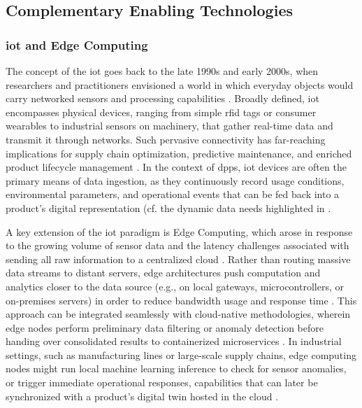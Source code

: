 \subsection{Complementary Enabling Technologies}

\subsubsection*{\acrlong{iot} and Edge Computing}
The concept of the \acrlong{iot} goes back to the late 1990s and early 2000s, when researchers and practitioners envisioned a world in which everyday objects would carry networked sensors and processing capabilities \autocite{Ashton.2009, Gubbi.2013}. Broadly defined, \ac{iot} encompasses physical devices, ranging from simple \ac{rfid} tags or consumer wearables to industrial sensors on machinery, that gather real-time data and transmit it through networks. Such pervasive connectivity has far-reaching implications for supply chain optimization, predictive maintenance, and enriched product lifecycle management \autocite{Gubbi.2013}. In the context of \ac{dpp}s, \ac{iot} devices are often the primary means of data ingestion, as they continuously record usage conditions, environmental parameters, and operational events that can be fed back into a product’s digital representation (cf. the dynamic data needs highlighted in \textcite{DeutschesInstitutfurNormunge.V..2020, Kuhn.2025}.

A key extension of the \ac{iot} paradigm is Edge Computing, which arose in response to the growing volume of sensor data and the latency challenges associated with sending all raw information to a centralized cloud \autocite{Shi.2016}. Rather than routing massive data streams to distant servers, edge architectures push computation and analytics closer to the data source (e.g., on local gateways, microcontrollers, or on-premises servers)  in order to reduce bandwidth usage and response time \autocite{Satyanarayanan.2017}. This approach can be integrated seamlessly with cloud-native methodologies, wherein edge nodes perform preliminary data filtering or anomaly detection before handing over consolidated results to containerized microservices \autocite{Dragoni.2017}. In industrial settings, such as manufacturing lines or large-scale supply chains, edge computing nodes might run local machine learning inference to check for sensor anomalies, or trigger immediate operational responses, capabilities that can later be synchronized with a product’s digital twin hosted in the cloud \autocite{Tao.2019b}.


